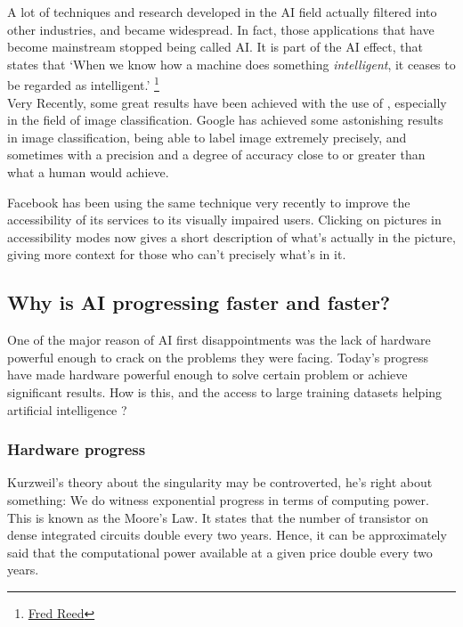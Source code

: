 \documentclass[12pt]{article}
\begin{document}
A lot of techniques and research developed in the AI field actually filtered
into  other industries, and became widespread. In fact, those applications that
have become  mainstream stopped being called AI. It is part of the AI effect,
that states that \lq When we know how a machine does something {\em
intelligent}, it ceases to be regarded as intelligent.\rq
\footnote{\href{http://www.washingtontimes.com/news/2006/apr/13/20060413-105217-7645r/}
{Fred Reed}}\\

Very Recently, some great results have been achieved with the use of
, especially  in the field of image classification. Google has
achieved some astonishing results in image classification, being able to
label image extremely precisely, and sometimes with a precision and a degree
of accuracy close to or greater than what a human would achieve.

Facebook has been using the same technique very recently to improve the
accessibility of its services to its visually impaired users. Clicking on
pictures in accessibility modes now gives a short description of what's actually
in the picture, giving more context for those who can't precisely what's in it.


\subsection{Why is AI progressing faster and faster?}

One of the major reason of AI first disappointments was the lack of hardware
powerful  enough to crack on the problems they were facing. Today's progress
have made hardware powerful enough to solve certain problem or achieve
significant results. How is this, and the  access to large training datasets
helping artificial intelligence ?

\subsubsection{Hardware progress}

Kurzweil's theory about the singularity may be controverted, he's right about
something: We do witness exponential progress in terms of computing power. This
is known as the Moore's Law. It states that the number of transistor on dense
integrated circuits double every two years. Hence, it can be approximately said
that the computational power available at a given price double every two years.
\end{document}
